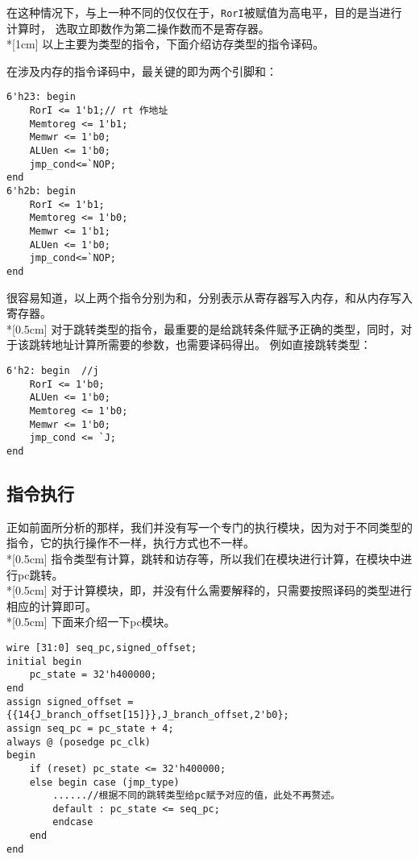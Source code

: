 \kaishu
在这种情况下，与上一种不同的仅仅在于，\lstinline$RorI$被赋值为高电平，目的是当进行计算时，
选取立即数作为第二操作数而不是寄存器。
\\*[1cm]
\songti
以上主要为类型的指令，下面介绍访存类型的指令译码。

\kaishu
在涉及内存的指令译码中，最关键的即为两个引脚和：
\begin{lstlisting}[style=verilog-style, caption={Mem type decoding}]
6'h23: begin
    RorI <= 1'b1;// rt 作地址
    Memtoreg <= 1'b1;
    Memwr <= 1'b0;
    ALUen <= 1'b0;
    jmp_cond<=`NOP;
end
6'h2b: begin
    RorI <= 1'b1;
    Memtoreg <= 1'b0;
    Memwr <= 1'b1;
    ALUen <= 1'b0;
    jmp_cond<=`NOP;
end
\end{lstlisting}

很容易知道，以上两个指令分别为和，分别表示从寄存器写入内存，和从内存写入寄存器。
\\*[0.5cm]
\songti
对于跳转类型的指令，最重要的是给跳转条件赋予正确的类型，同时，对于该跳转地址计算所需要的参数，也需要译码得出。
\kaishu
例如直接跳转类型：
\begin{lstlisting}[style=verilog-style, caption={Jump type decoding}]
6'h2: begin  //j
    RorI <= 1'b0;
    ALUen <= 1'b0;
    Memtoreg <= 1'b0;
    Memwr <= 1'b0;
    jmp_cond <= `J;
end
\end{lstlisting}
\subsection{指令执行}
\songti
正如前面所分析的那样，我们并没有写一个专门的执行模块，因为对于不同类型的指令，它的执行操作不一样，执行方式也不一样。
\\*[0.5cm]
指令类型有计算，跳转和访存等，所以我们在模块进行计算，在模块中进行pc跳转。
\\*[0.5cm]
对于计算模块，即，并没有什么需要解释的，只需要按照译码的类型进行相应的计算即可。
\\*[0.5cm]
下面来介绍一下pc模块。
\begin{lstlisting}[style=verilog-style, caption={program counter}]
wire [31:0] seq_pc,signed_offset;
initial begin
    pc_state = 32'h400000;
end
assign signed_offset = {{14{J_branch_offset[15]}},J_branch_offset,2'b0};
assign seq_pc = pc_state + 4;
always @ (posedge pc_clk)
begin
    if (reset) pc_state <= 32'h400000;
    else begin case (jmp_type)
        ......//根据不同的跳转类型给pc赋予对应的值，此处不再赘述。
        default : pc_state <= seq_pc;
        endcase
    end
end
\end{lstlisting}

